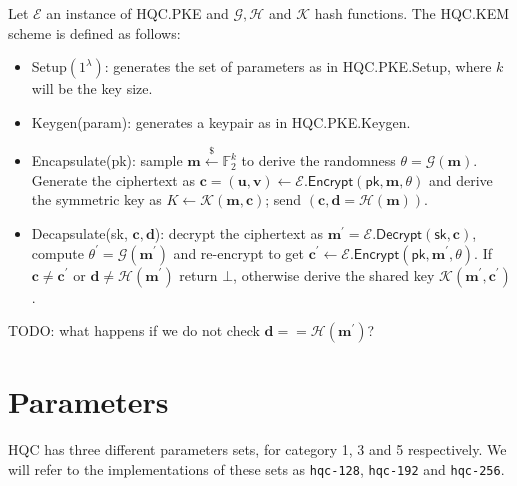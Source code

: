 Let $\mathcal{E}$ an instance of \textsf{HQC.PKE} and $\mathcal{G, H}$ and $\mathcal{K}$ hash functions. The \textsf{HQC.KEM} scheme is defined as follows:
\begin{itemize}
    \item \textsf{Setup}$(1^\lambda)$: generates the set of parameters as in \textsf{HQC.PKE.Setup}, where $k$ will be the key size.
    \item \textsf{Keygen(param)}: generates a keypair as in \textsf{HQC.PKE.Keygen}.
    \item \textsf{Encapsulate(pk)}: sample $\mathbf{m} \xleftarrow{\mathdollar} \mathds{F}_2^k$ to derive the randomness $\theta = \mathcal{G}(\mathbf{m})$.
    Generate the ciphertext as $\mathbf{c} = (\mathbf{u, v}) \leftarrow \mathcal{E}.\textsf{Encrypt}(\textsf{pk}, \mathbf{m}, \theta)$ and derive the symmetric key
    as $K \leftarrow \mathcal{K}(\mathbf{m, c})$; send $(\mathbf{c, d} = \mathcal{H}(\mathbf{m})).$
    \item \textsf{Decapsulate}(\textsf{sk}, $\mathbf{c, d}$): decrypt the ciphertext as $\mathbf{m^\prime} = \mathcal{E}.\textsf{Decrypt}(\textsf{sk}, \mathbf{c})$, 
    compute $\theta^\prime = \mathcal{G}(\mathbf{m}^\prime)$ and re-encrypt to get $\mathbf{c^\prime} \leftarrow \mathcal{E}.\textsf{Encrypt}(\textsf{pk}, \mathbf{m^\prime}, \theta)$.
    If $\mathbf{c \neq c^\prime}$ or $\mathbf{d} \neq \mathcal{H}(\mathbf{m^\prime})$ return $\bot$, otherwise derive the shared key $\mathcal{K}(\mathbf{m^\prime, c^\prime})$.
\end{itemize}

TODO: what happens if we do not check $\mathbf{d} == \mathcal{H}(\mathbf{m^\prime})$?

\section{Parameters}
HQC has three different parameters sets, for category 1, 3 and 5 respectively. We will refer to the implementations
	of these sets as \texttt{hqc-128}, \texttt{hqc-192} and \texttt{hqc-256}.

